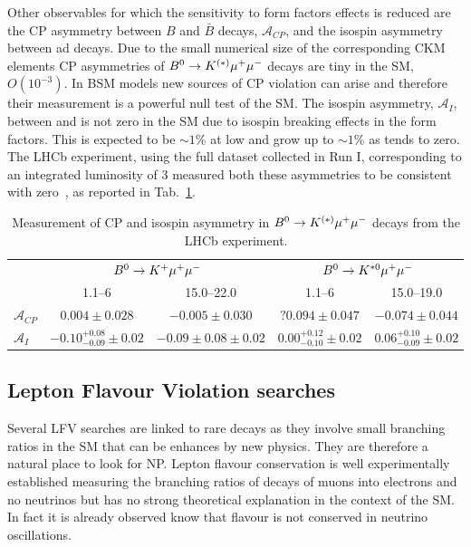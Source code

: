 Other observables for which the sensitivity to form factors effects is reduced are the CP asymmetry between
$B$ and $\bar{B}$ decays, $\mathcal{A}_{CP}$, and the isospin asymmetry between \Bz ad \Bu decays.
Due to the small numerical size of the corresponding CKM elements CP asymmetries of $B^0\rightarrow K^{(*)}\mu^+\mu^-$
decays are tiny in the SM, $O(10^{-3})$. In BSM models new sources of CP violation can arise and therefore
their measurement is a powerful null test of the SM. 
The isospin asymmetry, $\mathcal{A}_{I}$, between \Bu and \Bz is not zero in the SM due
to isospin breaking effects in the form factors.
This is expected to be $\sim1$\% at low \qsq and grow up to $\sim1$\% as \qsq tends to zero.
The LHCb experiment, using the full dataset collected in Run I, corresponding to an integrated luminosity of
3 \invfb measured both these asymmetries to be consistent with zero~\cite{LHCB-PAPER-2014-006,LHCB-PAPER-2014-032}, as reported in Tab.~\ref{tab:AcpAI}. 
%
\begin{table}
\begin{small}
\begin{tabular}{l|cc|cc}
					& \multicolumn{2}{c|}{$B^0\rightarrow K^+\mu^+\mu^-$}			&\multicolumn{2}{c}{$B^0\rightarrow K^{*0}\mu^+\mu^-$}	\\
\qsq [\gevgevcccc]		& 1.1--6 			 			& 15.0--22.0 				& 	1.1--6 & 15.0--19.0 \\ \hline
$\mathcal{A}_{CP}$  & $0.004 \pm 0.028$	 			& $-0.005 \pm 0.030$		&	$?0.094 \pm 0.047$	& $-0.074 \pm 0.044$ \\
$\mathcal{A}_{I}$	& $-0.10^{+0.08}_{-0.09} \pm 0.02$	& $-0.09 \pm 0.08 \pm 0.02$	&	$0.00^{+0.12}_{-0.10} \pm 0.02$  &	$0.06^{+0.10}_{-0.09} \pm 0.02$ \\
\end{tabular}
\end{small}
\caption{Measurement of CP and isospin asymmetry in $B^0\rightarrow K^{(*)}\mu^+\mu^-$ decays from the LHCb experiment.  }
\label{tab:AcpAI}
\end{table}

\subsection{Lepton Flavour Violation searches}

Several LFV searches are linked to rare decays as they involve small branching ratios
in the SM that can be enhances by new physics. They are therefore a natural place to look for NP.
Lepton flavour conservation is well experimentally established measuring the branching ratios of
decays of muons into electrons and no neutrinos but has no strong theoretical
explanation in the context of the SM. In fact it is already observed know that flavour
is not conserved in neutrino oscillations. 

